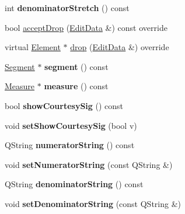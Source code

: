 \begin{DoxyCompactItemize}
int {\bfseries denominator\+Stretch} () const
\item 
bool \hyperlink{class_ms_1_1_time_sig_aabc454ee0c8f3f218bbfb6767d6e7212}{accept\+Drop} (\hyperlink{class_ms_1_1_edit_data}{Edit\+Data} \&) const override
\item 
virtual \hyperlink{class_ms_1_1_element}{Element} $\ast$ \hyperlink{class_ms_1_1_time_sig_a3d1b3e9783dd176c2e479ecf3e250e2a}{drop} (\hyperlink{class_ms_1_1_edit_data}{Edit\+Data} \&) override
\item 
\mbox{\label{class_ms_1_1_time_sig_ac2f805e40611e2222151105df2579d2e}} 
\hyperlink{class_ms_1_1_segment}{Segment} $\ast$ {\bfseries segment} () const
\item 
\mbox{\label{class_ms_1_1_time_sig_aa1bd3c613a1e74f1d7558ec7c7496e19}} 
\hyperlink{class_ms_1_1_measure}{Measure} $\ast$ {\bfseries measure} () const
\item 
\mbox{\label{class_ms_1_1_time_sig_a8f25e26cbb3bc897700d62e59fcd94a0}} 
bool {\bfseries show\+Courtesy\+Sig} () const
\item 
\mbox{\label{class_ms_1_1_time_sig_a7cc62e2f26faccafbd88448a7c52ed66}} 
void {\bfseries set\+Show\+Courtesy\+Sig} (bool v)
\item 
\mbox{\label{class_ms_1_1_time_sig_a2ab7474ffaeed1c40269d7779794f9a9}} 
Q\+String {\bfseries numerator\+String} () const
\item 
\mbox{\label{class_ms_1_1_time_sig_aea564d0fa5b439ed63fc02052584da36}} 
void {\bfseries set\+Numerator\+String} (const Q\+String \&)
\item 
\mbox{\label{class_ms_1_1_time_sig_a0d87682d4357361cb2c0a77a0ce8ba94}} 
Q\+String {\bfseries denominator\+String} () const
\item 
\mbox{\label{class_ms_1_1_time_sig_a12a2583b36b0a9220f84f94209ed0774}} 
void {\bfseries set\+Denominator\+String} (const Q\+String \&)
\item 
\mbox{\label{class_ms_1_1_time_sig_add6c2e6d4c27efb72cc99c9f9f736ca7}} 

\end{DoxyCompactItemize}

